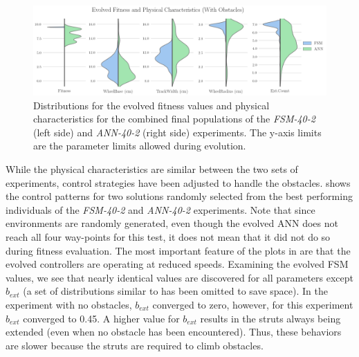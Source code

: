\begin{figure}[!ht]
    \centering

    \includegraphics[width=\columnwidth]{figures/4-results/40-2-best_params.png}

    \vspace{-0.07in}

    \caption{Distributions for the evolved fitness values and physical characteristics for the combined final populations of the \emph{FSM-40-2} (left side) and \emph{ANN-40-2} (right side) experiments. The y-axis limits are the parameter limits allowed during evolution.}
    \label{fig:40-2-best-params}


\end{figure}



While the physical characteristics are similar between the two sets of experiments, control strategies have been adjusted to handle the obstacles.
%
 shows the control patterns for two solutions randomly selected from the best performing individuals of the \emph{FSM-40-2} and \emph{ANN-40-2} experiments.
%
Note that since environments are randomly generated, even though the evolved ANN does not reach all four way-points for this test, it does not mean that it did not do so during fitness evaluation.
%
The most important feature of the plots in  are that the evolved controllers are operating at reduced speeds.
%
%
Examining the evolved FSM values, we see that nearly identical values are discovered for all parameters except $b_{\mathit{ext}}$
(a set of distributions similar to  has been omitted to save space).
%
In the experiment with no obstacles, $b_{\mathit{ext}}$ converged to zero, however, for this experiment $b_{\mathit{ext}}$ converged to 0.45.
%
A higher value for $b_{\mathit{ext}}$ results in the struts always being extended (even when no obstacle has been encountered).
%
Thus, these behaviors are slower because the struts are required to climb obstacles.

